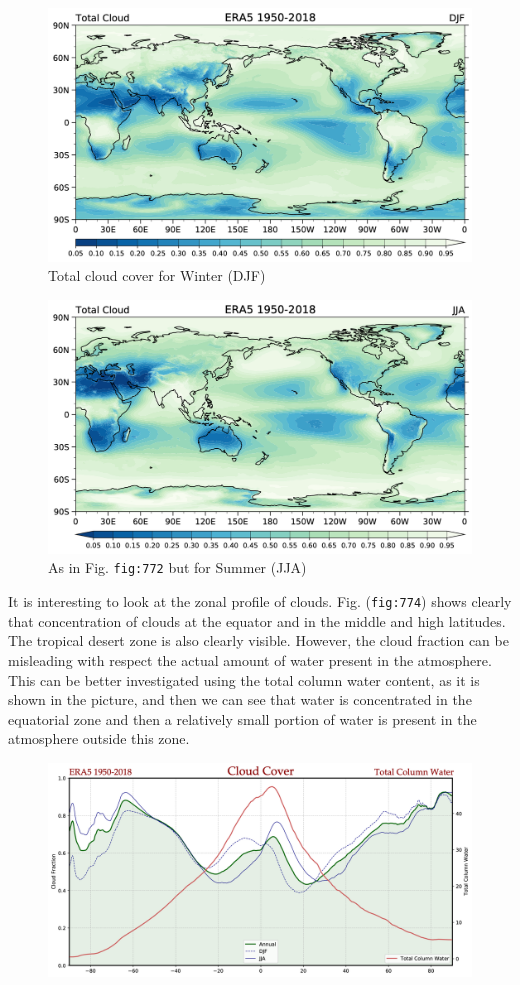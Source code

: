 \begin{figure}
\centering
\includegraphics[width = .7 \textwidth]{figs/GD/CloudsDJF.png}
\caption{Total cloud cover for Winter (DJF)}
\end{figure}

\begin{figure}
\centering
\includegraphics[width = .7 \textwidth]{figs/GD/CloudsJJA.png}
\caption{As in Fig. \texttt{fig:772} but for Summer (JJA)}
\label{fig:}
\end{figure}

It is interesting to look at the zonal profile of clouds. Fig.
(\texttt{fig:774}) shows clearly that concentration of clouds at the
equator and in the middle and high latitudes. The tropical desert zone
is also clearly visible. However, the cloud fraction can be misleading
with respect the actual amount of water present in the atmosphere. This
can be better investigated using the total column water content, as it
is shown in the picture, and then we can see that water is concentrated
in the equatorial zone and then a relatively small portion of water is
present in the atmosphere outside this zone.

\begin{figure}
\centering
\includegraphics[width = .7 \textwidth]{figs/GD/CloudsProfile.png}
\caption{} \label{fig:}
\end{figure}
